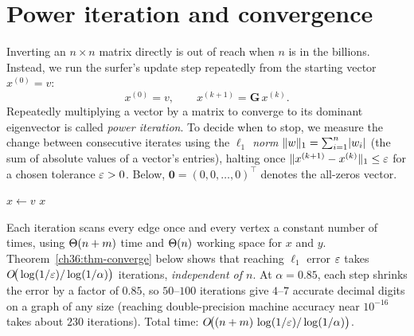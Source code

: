 \section{Power iteration and convergence}
\label{ch36:power}

Inverting an $n \times n$ matrix directly is out of reach when $n$ is in the billions. Instead, we run the surfer's update step repeatedly from the starting vector $x^{(0)} = v$:
\[
  x^{(0)} = v, \qquad x^{(k+1)} = \mathbf{G}\, x^{(k)}.
\]
Repeatedly multiplying a vector by a matrix to converge to its dominant eigenvector is called \emph{power iteration}. To decide when to stop, we measure the change between consecutive iterates using the \emph{$\ell_1$ norm} $\lVert w\rVert_1 = \sum_{i=1}^n \lvert w_i\rvert$ (the sum of absolute values of a vector's entries), halting once $\lVert x^{(k+1)} - x^{(k)}\rVert_1 \le \varepsilon$ for a chosen tolerance $\varepsilon > 0$. Below, $\mathbf{0} = (0,0,\dots,0)^\top$ denotes the all-zeros vector.

\begin{algorithm}[H]
\caption{PageRank by power iteration (sparse, dangling-aware)}
\label{ch36:alg-pagerank}
$x \gets v$\;
\Return $x$\;
\end{algorithm}

\begin{complexitybox}
Each iteration scans every edge once and every vertex a constant number of times, using $\Theta(n + m)$ time and $\Theta(n)$ working space for $x$ and $y$. Theorem~\ref{ch36:thm-converge} below shows that reaching $\ell_1$ error $\varepsilon$ takes $O\!\big(\log(1/\varepsilon) / \log(1/\alpha)\big)$ iterations, \emph{independent of $n$}. At $\alpha = 0.85$, each step shrinks the error by a factor of $0.85$, so $50$--$100$ iterations give $4$--$7$ accurate decimal digits on a graph of any size (reaching double-precision machine accuracy near $10^{-16}$ takes about $230$ iterations). Total time: $O\!\big((n+m)\,\log(1/\varepsilon)/\log(1/\alpha)\big)$.
\end{complexitybox}

